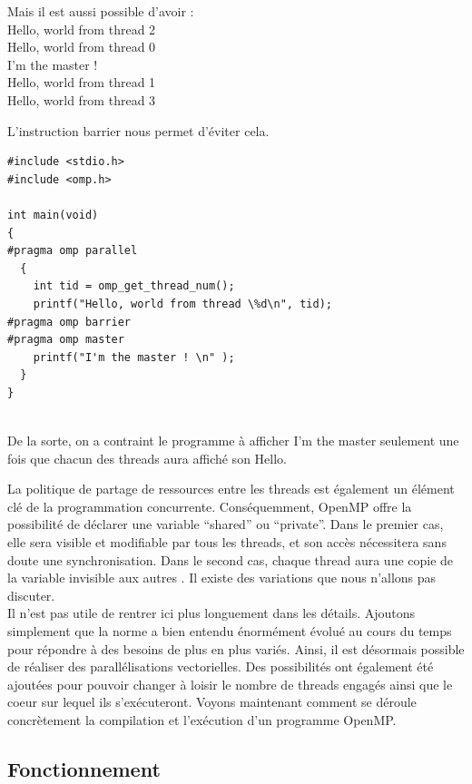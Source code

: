 \documentclass{report}
\begin{document}
Mais il est aussi possible d'avoir :
\\Hello, world from thread 2
\\Hello, world from thread 0
\\ I'm the master ! 
\\Hello, world from thread 1
\\Hello, world from thread 3

 L'instruction barrier nous permet d'éviter cela.
\begin{lstlisting}
#include <stdio.h>
#include <omp.h>

int main(void)
{
#pragma omp parallel
  {
    int tid = omp_get_thread_num();
    printf("Hello, world from thread \%d\n", tid);
#pragma omp barrier
#pragma omp master
    printf("I'm the master ! \n" );
  }
}


\end{lstlisting}

De la sorte, on a contraint le programme à afficher I'm the master seulement une fois que chacun 
des threads aura affiché son Hello.

La politique de partage de ressources entre les threads est également un élément clé de la programmation
concurrente. Conséquemment, OpenMP offre la possibilité de déclarer une variable ``shared'' ou 
``private''. 
Dans le premier cas, elle sera visible et modifiable par tous les threads, et son accès nécessitera sans
doute une synchronisation. Dans le second cas, chaque thread aura une copie de la variable invisible aux 
autres \cite{ompmem}. Il existe des variations que nous n'allons pas discuter.
\\Il n'est pas utile de rentrer ici plus longuement dans les détails. Ajoutons simplement que la
norme a bien entendu énormément évolué au cours du temps pour répondre à des besoins de plus en plus
variés. Ainsi, il est désormais possible de réaliser des parallélisations vectorielles. Des possibilités
ont également été ajoutées pour pouvoir changer à loisir le nombre de threads engagés ainsi que le coeur 
sur lequel ils s'exécuteront. Voyons maintenant comment se déroule concrètement la compilation et
l'exécution d'un programme OpenMP.

\subsection{Fonctionnement}
\end{document}
